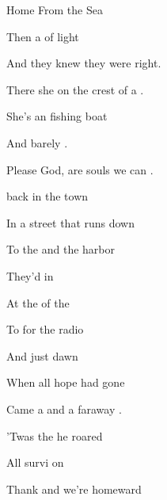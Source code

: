\begin{SBSong}{Home From the Sea}
\begin{SBVerse}
    Then a  of light

    And they knew they were right.

    There she  on the crest of a .

    She's an  fishing boat

    And  barely .

    Please God,  are souls we can .
  \end{SBVerse}
  
  \begin{SBVerse}
     back in the town

    In a street that runs down

    To the  and the harbor 

    They'd  in 

    At the  of the 

    To  for the radio 

    And just  dawn

    When all hope had gone

    Came a  and a faraway .

    'Twas the  he roared

    All survi on 

    Thank  and we're homeward 
  \end{SBVerse}
\end{SBSong}
